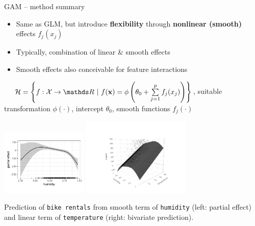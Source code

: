 \begin{frame2}{GAM -- method summary}
  
 

\begin{itemize}
  \item Same as GLM, but introduce \textbf{flexibility} through
  \textbf{nonlinear (smooth)} effects $f_j(x_j)$
  \item Typically, combination of linear \& smooth effects
  \item Smooth effects also conceivable for feature interactions
\end{itemize}

 ~~
$\Hspace = \left\{f: \Xspace \to \R ~|~\fx = \phi \left(\theta_0 + \textstyle \sumjp
f_j(x_j) \right) \right\}$,
suitable transformation $\phi(\cdot)$, intercept $\theta_0$, smooth
functions $f_j(\cdot)$

\includegraphics[width=0.31\textwidth]{figure/gam_bike_partial_effect}
\includegraphics[width=0.39\textwidth, trim=0 0 0 80, clip]{figure/gam_bike_pred}

\small
Prediction of \texttt{bike rentals} from smooth term of \texttt{humidity}
(left: partial effect) and linear term of \texttt{temperature} (right: bivariate
prediction).
\normalsize

\end{frame2}


